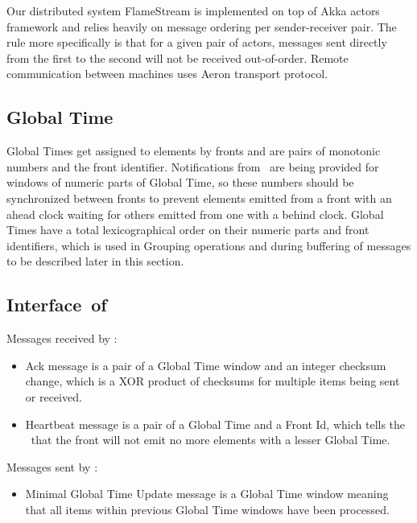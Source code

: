 \label {fs-acker-impl}


Our distributed system FlameStream is implemented on top of Akka actors framework and relies heavily on message ordering per sender-receiver pair. The rule more specifically is that for a given pair of actors, messages sent directly from the first to the second will not be received out-of-order. Remote communication between machines uses Aeron transport protocol.

\subsection{Global Time}

Global Times get assigned to elements by fronts and are pairs of monotonic numbers and the front identifier. Notifications from \tracker\ are being provided for windows of numeric parts of Global Time, so these numbers should be synchronized between fronts to prevent elements emitted from a front with an ahead clock waiting for others emitted from one with a behind clock. Global Times have a total lexicographical order on their numeric parts and front identifiers, which is used in Grouping operations and during buffering of messages to be described later in this section.

\subsection{Interface\ of\ \tracker\ }

Messages received by \tracker:
\begin{itemize}
	\item Ack message is a pair of a Global Time window and an integer checksum change, which is a XOR product of checksums for multiple items being sent or received.
	\item Heartbeat message is a pair of a Global Time and a Front Id, which tells the \tracker\ that the front will not emit no more elements with a lesser Global Time.
\end{itemize}
Messages sent by \tracker:
\begin{itemize}
	\item Minimal Global Time Update message is a Global Time window meaning that all items within previous Global Time windows have been processed.
\end{itemize}


